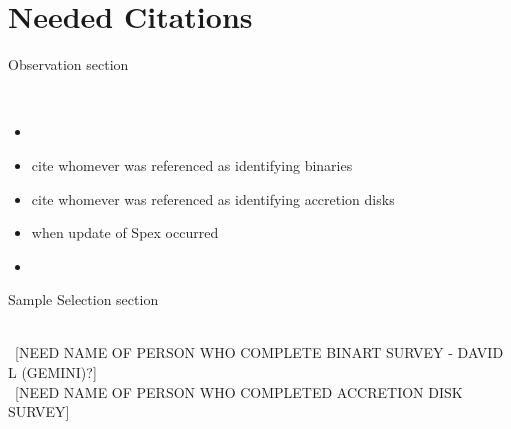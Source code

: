 \section{Needed Citations}

\begin{bf}Observation section\end{bf}\\
\begin{itemize}
\item \cite{Rayner_2003}\\
\item cite whomever was referenced as identifying binaries \cite{Adam_Krauss_or_other_paper}\\
\item cite whomever was referenced as identifying accretion disks \cite{disk_guy}\\
\item when update of Spex occurred \cite{Spex}\\
\item \cite{2mass_catalog_for_j_mags}
\end{itemize} 



\begin{bf}Sample Selection section\end{bf}\\
~[NEED NAME OF PERSON WHO COMPLETE BINART SURVEY - DAVID L (GEMINI)?]\\
~[NEED NAME OF PERSON WHO COMPLETED ACCRETION DISK SURVEY]